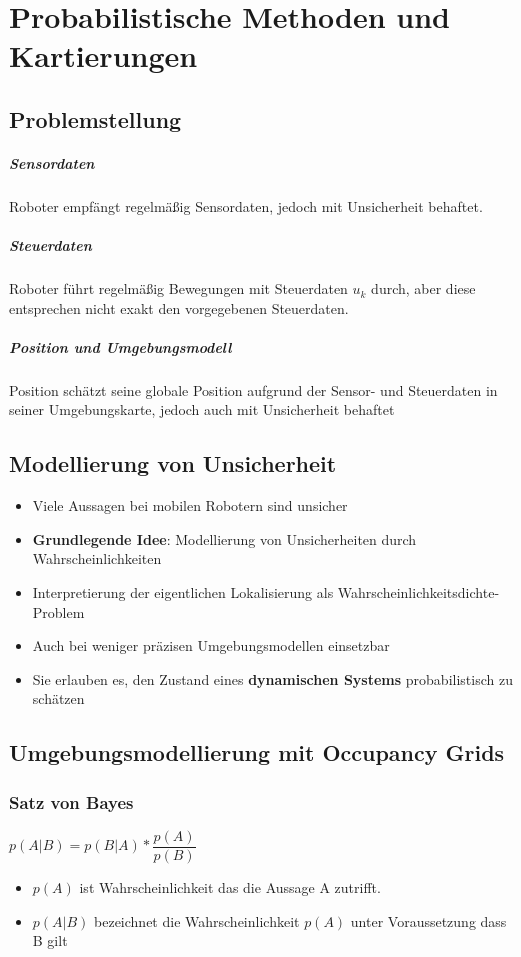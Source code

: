 \chapter{Probabilistische Methoden und Kartierungen}
\section{Problemstellung}
\paragraph{Sensordaten}
Roboter empfängt regelmäßig Sensordaten, jedoch mit Unsicherheit behaftet.
\paragraph{Steuerdaten}
Roboter führt regelmäßig Bewegungen mit Steuerdaten $u_k$ durch, aber diese entsprechen nicht exakt den vorgegebenen Steuerdaten.
\paragraph{Position und Umgebungsmodell}
Position schätzt seine globale Position aufgrund der Sensor- und Steuerdaten in seiner Umgebungskarte, jedoch auch mit Unsicherheit behaftet
\section{Modellierung von Unsicherheit}
\begin{itemize}
	\item Viele Aussagen bei mobilen Robotern sind unsicher
	\item \textbf{Grundlegende Idee}: Modellierung von Unsicherheiten durch Wahrscheinlichkeiten
	\item Interpretierung der eigentlichen Lokalisierung als Wahrscheinlichkeitsdichte-Problem
	\item Auch bei weniger präzisen Umgebungsmodellen einsetzbar
	\item Sie erlauben es, den Zustand eines \textbf{dynamischen Systems} probabilistisch zu schätzen
\end{itemize}
\section{Umgebungsmodellierung mit Occupancy Grids}
\subsection{Satz von Bayes}
$p (A|B) = p(B|A) * \dfrac{p(A)}{p(B)}$
\begin{itemize}
	\item $p(A)$ ist Wahrscheinlichkeit das die Aussage A zutrifft.
	\item $p(A|B)$ bezeichnet die Wahrscheinlichkeit $p(A)$ unter Voraussetzung dass B gilt
\end{itemize}
